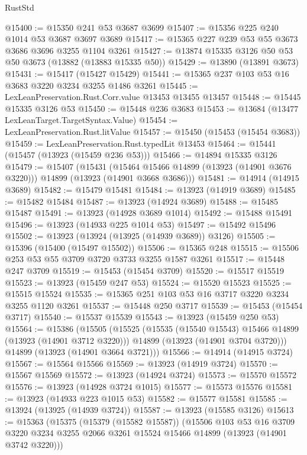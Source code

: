 \begin{lexlean}{RustStd}
\begin{coremodule}
{\begin{coremodule}
{{{{{{{{{{{{{{{{{{{{{{{{{{{{{{{{{{{{{@15400 := @15350 @241 @53 @3687 @3699
@15407 := @15356 @225 @240 @1014 @53 @3687 @3697 @3689
@15417 := @15365 @227 @239 @53 @55 @3673 @3686 @3696 @3255 @1104 @3261
@15427 := @13874 @15335 @3126 @50 @53 @50 @3673 (@13882 (@13883 @15335 @50))
@15429 := @13890 (@13891 @3673)
@15431 := @15417 (@15427 @15429)
@15441 := @15365 @237 @103 @53 @16 @3683 @3220 @3234 @3255 @1486 @3261
@15445 := LexLeanPreservation.Rust.Corr.value @13453 @13455 @13457
@15448 := @15445 @15335 @3126 @53
@15450 := @15448 @236 @3683
@15453 := @13684 (@13477 LexLeanTarget.TargetSyntax.Value)
@15454 := LexLeanPreservation.Rust.litValue
@15457 := @15450 (@15453 (@15454 @3683))
@15459 := LexLeanPreservation.Rust.typedLit @13453
@15464 := @15441 (@15457 (@13923 (@15459 @236 @53)))
@15466 := @14894 @15335 @3126
@15479 := @15407
    (@15431
      (@15464 @15466 @14899 (@13923 (@14901 @3676 @3220)))
      @14899
      (@13923 (@14901 @3668 @3686)))
@15481 := @14914 (@14915 @3689)
@15482 := @15479 @15481
@15484 := @13923 (@14919 @3689)
@15485 := @15482 @15484
@15487 := @13923 (@14924 @3689)
@15488 := @15485 @15487
@15491 := @13923 (@14928 @3689 @1014)
@15492 := @15488 @15491
@15496 := @13923 (@14933 @225 @1014 @53)
@15497 := @15492 @15496
@15502 := @13923 (@13924 (@13925 (@14939 @3689)) @3126)
@15505 := @15396 (@15400 (@15497 @15502))
@15506 := @15365 @248
@15515 := @15506 @253 @53 @55 @3709 @3720 @3733 @3255 @1587 @3261
@15517 := @15448 @247 @3709
@15519 := @15453 (@15454 @3709)
@15520 := @15517 @15519
@15523 := @13923 (@15459 @247 @53)
@15524 := @15520 @15523
@15525 := @15515 @15524
@15535 := @15365 @251 @103 @53 @16 @3717 @3220 @3234 @3255 @1120 @3261
@15537 := @15448 @250 @3717
@15539 := @15453 (@15454 @3717)
@15540 := @15537 @15539
@15543 := @13923 (@15459 @250 @53)
@15564 := @15386
    (@15505
      (@15525
        (@15535 (@15540 @15543) @15466 @14899 (@13923 (@14901 @3712 @3220)))
        @14899
        (@13923 (@14901 @3704 @3720)))
      @14899
      (@13923 (@14901 @3664 @3721)))
@15566 := @14914 (@14915 @3724)
@15567 := @15564 @15566
@15569 := @13923 (@14919 @3724)
@15570 := @15567 @15569
@15572 := @13923 (@14924 @3724)
@15573 := @15570 @15572
@15576 := @13923 (@14928 @3724 @1015)
@15577 := @15573 @15576
@15581 := @13923 (@14933 @223 @1015 @53)
@15582 := @15577 @15581
@15585 := @13924 (@13925 (@14939 @3724))
@15587 := @13923 (@15585 @3126)
@15613 := @15363
    (@15375
      (@15379 (@15582 @15587))
      (@15506
        @103
        @53
        @16
        @3709
        @3220
        @3234
        @3255
        @2066
        @3261
        @15524
        @15466
        @14899
        (@13923 (@14901 @3742 @3220)))
}}}}}}}}}}}}}}}}}}}}}}}}}}}}}}}}}}}}}
\end{coremodule}}
\end{coremodule}
\end{lexlean}
